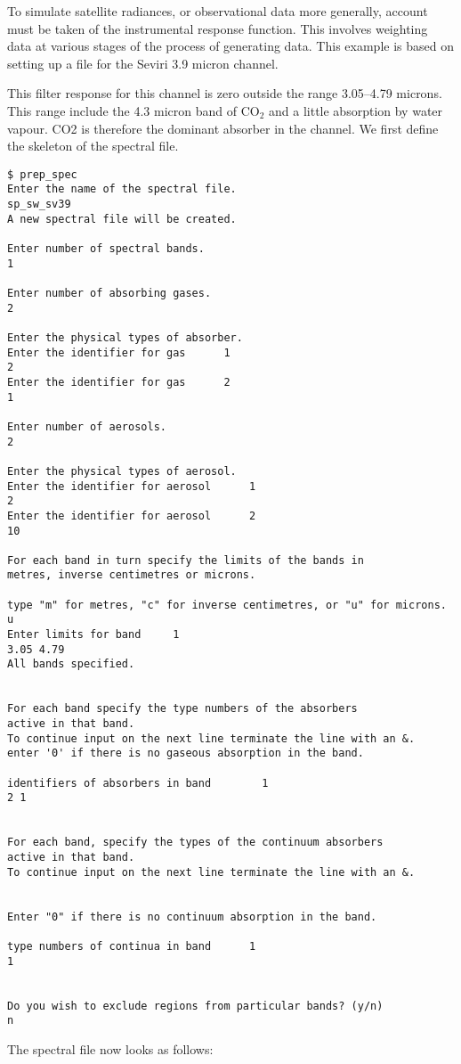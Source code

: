To simulate satellite radiances, or observational data more generally,
account must be taken of the instrumental response function. This involves
weighting data at various stages of the process of generating data.
This example is based on setting up a file for the Seviri 3.9 micron channel.

This filter response for this channel is zero outside the range 3.05--4.79
microns. This range include the 4.3 micron band of CO${}_2$ and a little
absorption by water vapour. CO2 is therefore the dominant absorber in the
channel. We first define the skeleton of the spectral file.

{\small
\begin{verbatim}
$ prep_spec
Enter the name of the spectral file.
sp_sw_sv39
A new spectral file will be created.

Enter number of spectral bands.
1

Enter number of absorbing gases.
2

Enter the physical types of absorber.
Enter the identifier for gas      1
2
Enter the identifier for gas      2
1

Enter number of aerosols.
2

Enter the physical types of aerosol.
Enter the identifier for aerosol      1
2
Enter the identifier for aerosol      2
10

For each band in turn specify the limits of the bands in 
metres, inverse centimetres or microns.

type "m" for metres, "c" for inverse centimetres, or "u" for microns.
u
Enter limits for band     1
3.05 4.79
All bands specified.


For each band specify the type numbers of the absorbers
active in that band.
To continue input on the next line terminate the line with an &.
enter '0' if there is no gaseous absorption in the band.

identifiers of absorbers in band        1
2 1


For each band, specify the types of the continuum absorbers 
active in that band.
To continue input on the next line terminate the line with an &.


Enter "0" if there is no continuum absorption in the band.

type numbers of continua in band      1
1


Do you wish to exclude regions from particular bands? (y/n)
n
\end{verbatim}
}

The spectral file now looks as follows:

